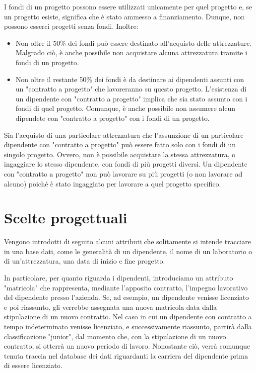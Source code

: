         I fondi di un progetto possono essere utilizzati unicamente per quel progetto e, se un progetto esiste, significa che è stato ammesso a finanziamento. Dunque, non possono esserci progetti senza fondi. Inoltre:
        \begin{itemize}
            \item Non oltre il 50\% dei fondi può essere destinato all'acquisto delle attrezzature. Malgrado ciò, è anche possibile non acquistare alcuna attrezzatura tramite i fondi di un progetto.
            \item Non oltre il restante 50\% dei fondi è da destinare ai dipendenti assunti con un "contratto a progetto" che lavoreranno su questo progetto. L'esistenza di un dipendente con "contratto a progetto" implica che sia stato assunto con i fondi di quel progetto. Comunque, è anche possibile non assumere alcun dipendete con "contratto a progetto" con i fondi di un progetto.
        \end{itemize}
        Sia l'acquisto di una particolare attrezzatura che l'assunzione di un particolare dipendente con "contratto a progetto" può essere fatto solo con i fondi di un singolo progetto. Ovvero, non è possibile acquistare la stessa attrezzatura, o ingaggiare lo stesso dipendente, con fondi di più progetti diversi. Un dipendente con "contratto a progetto" non può lavorare su più progetti (o non lavorare ad alcuno) poiché è stato ingaggiato per lavorare a quel progetto specifico.


    \section{Scelte progettuali}
        Vengono introdotti di seguito alcuni attributi che solitamente si intende tracciare in una base dati, come le generalità di un dipendente, il nome di un laboratorio o di un'attrezzatura, una data di inizio e fine progetto.
        
        In particolare, per quanto riguarda i dipendenti, introduciamo un attributo "matricola" che rappresenta, mediante l'apposito contratto, l'impegno lavorativo del dipendente presso l'azienda. Se, ad esempio, un dipendente venisse licenziato e poi riassunto, gli verrebbe assegnata una nuova matricola data dalla stipulazione di un nuovo contratto.      
        Nel caso in cui un dipendente con contratto a tempo indeterminato venisse licenziato, e successivamente riassunto, partirà dalla classificazione "junior", dal momento che, con la stipulazione di un nuovo contratto, si otterrà un nuovo periodo di lavoro. Nonostante ciò, verrà comunque tenuta traccia nel database dei dati riguardanti la carriera del dipendente prima di essere licenziato.
        
